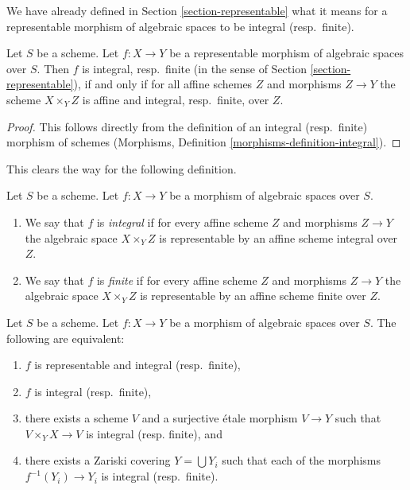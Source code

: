 \noindent
We have already defined in Section \ref{section-representable}
what it means for a representable morphism of algebraic spaces
to be integral (resp.\ finite).

\begin{lemma}
\label{lemma-integral-representable}
Let $S$ be a scheme. Let $f : X \to Y$ be a representable
morphism of algebraic spaces over $S$. Then
$f$ is integral, resp.\ finite
(in the sense of Section \ref{section-representable}),
if and only if for all affine schemes $Z$
and morphisms $Z \to Y$ the scheme $X \times_Y Z$ is affine and
integral, resp.\ finite, over $Z$.
\end{lemma}

\begin{proof}
This follows directly from the definition of an integral (resp.\ finite)
morphism of schemes
(Morphisms, Definition \ref{morphisms-definition-integral}).
\end{proof}

\noindent
This clears the way for the following definition.

\begin{definition}
\label{definition-integral}
Let $S$ be a scheme.
Let $f : X \to Y$ be a morphism of algebraic spaces over $S$.
\begin{enumerate}
\item We say that $f$ is {\it integral} if for every affine scheme $Z$
and morphisms $Z \to Y$ the algebraic space $X \times_Y Z$ is
representable by an affine scheme integral over $Z$.
\item We say that $f$ is {\it finite} if for every affine scheme $Z$
and morphisms $Z \to Y$ the algebraic space $X \times_Y Z$ is
representable by an affine scheme finite over $Z$.
\end{enumerate}
\end{definition}

\begin{lemma}
\label{lemma-integral-local}
Let $S$ be a scheme.
Let $f : X \to Y$ be a morphism of algebraic spaces over $S$.
The following are equivalent:
\begin{enumerate}
\item $f$ is representable and integral (resp.\ finite),
\item $f$ is integral (resp.\ finite),
\item there exists a scheme $V$ and a surjective \'etale morphism
$V \to Y$ such that $V \times_Y X \to V$ is integral (resp. finite), and
\item there exists a Zariski covering $Y = \bigcup Y_i$ such that
each of the morphisms $f^{-1}(Y_i) \to Y_i$ is integral (resp.\ finite).
\end{enumerate}
\end{lemma}

